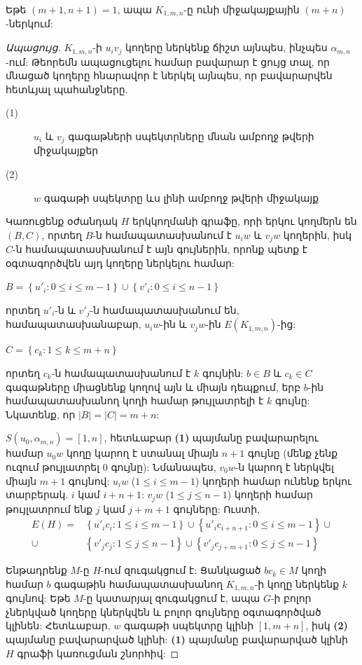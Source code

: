 \begin{hide}
\begin{theorem}
\label{t1_K1mn_coprime}
Եթե $(m+1,n+1)=1$, ապա $K_{1,m,n}$-ը ունի միջակայքային $(m+n)$-ներկում:
\end{theorem}
\begin{proof}[Ապացույց]
$K_{1,m,n}$-ի $u_iv_j$ կողերը ներկենք ճիշտ այնպես, ինչպես $\alpha_{m,n}$-ում: Թեորեմն ապացուցելու համար բավարար է ցույց տալ, որ մնացած կողերը հնարավոր է ներկել այնպես, որ բավարարվեն հետևյալ պահանջները.
\begin{description}
\item[(1)] $u_i$ և $v_j$ գագաթների սպեկտրները մնան ամբողջ թվերի միջակայքեր
\item[(2)] $w$ գագաթի սպեկտրը ևս լինի ամբողջ թվերի միջակայք
\end{description}
Կառուցենք օժանդակ $H$ երկկողմանի գրաֆը, որի երկու կողմերն են $(B,C)$, որտեղ $B$-ն համապատասխանում է $u_iw$ և $v_jw$ կողերին, իսկ $C$-ն համապատասխանում է այն գույներին, որոնք պետք է օգտագործվեն այդ կողերը ներկելու համար:
\begin{center}
$B = \left\{u'_i : 0 \leq i \leq m-1\right\} \cup \left\{v'_i : 0 \leq i
\leq n-1\right\}$
\end{center}
որտեղ $u'_i$-ն և $v'_j$-ն համապատասխանում են, համապատասխանաբար, $u_iw$-ին և $v_jw$-ին $E(K_{1,m,n})$-ից:

\begin{center}
$C = \left\{c_k : 1 \leq k \leq m+n\right\}$
\end{center}
որտեղ $c_k$-ն համապատասխանում է $k$ գույնին: $b\in B$ և
$c_k \in C$ գագաթները միացնենք կողով այն և միայն դեպքում, երբ $b$-ին համապատասխանող կողի համար թույլատրելի է $k$ գույնը: Նկատենք, որ $|B|=|C|=m+n$:

$S(u_0,\alpha_{m,n}) = [1,n]$, հետևաբար 
\textbf{(1)} պայմանը բավարարելու համար $u_0w$ կողը կարող է ստանալ միայն $n+1$ գույնը (մենք չենք ուզում թույլատրել $0$ գույնը): Նմանապես, $v_0w$-ն կարող է ներկվել միայն $m+1$ գույնով: $u_iw$
($1\leq i\leq m-1$) կողերի համար ունենք երկու տարբերակ. $i$ կամ $i+n+1$: $v_jw$ ($1
\leq j \leq n-1$) կողերի համար թույլատրում ենք $j$ կամ $j+m+1$ գույները: Ուստի,
\begin{align*}
E(H) = &\left\{u'_ic_i : 1 \leq i \leq m-1 \right\} \cup
\left\{u'_ic_{i+n+1} : 0 \leq i \leq m-1 \right\} \cup \\
\cup &\left\{v'_jc_j : 1 \leq j \leq n-1 \right\} \cup
\left\{v'_jc_{j+m+1} : 0 \leq j \leq n-1 \right\}
\end{align*}

Ենթադրենք $M$-ը $H$-ում զուգակցում է: Ցանկացած $bc_k \in M$ կողի համար 
$b$ գագաթին համապատասխանող $K_{1,m,n}$-ի կողը ներկենք $k$ գույնով: Եթե $M$-ը կատարյալ զուգակցում է, ապա $G$-ի բոլոր չներկված կողերը կներկվեն և բոլոր գույները օգտագործված կլինեն:
Հետևաբար, $w$ գագաթի սպեկտրը կլինի $[1,m+n]$, իսկ \textbf{(2)} պայմանը բավարարված կլինի: \textbf{(1)} պայմանը բավարարված կլինի $H$ գրաֆի կառուցման շնորհիվ:


\end{proof}
\end{hide}
